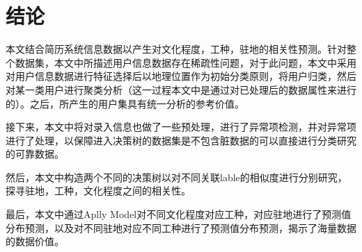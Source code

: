 \section{结论}
本文结合简历系统信息数据以产生对文化程度，工种，驻地的相关性预测。针对整个数据集，本文中所描述用户信息数据存在稀疏性问题，对于此问题，本文中采用对用户信息数据进行特征选择后以地理位置作为初始分类原则，将用户归类，然后对某一类用户进行聚类分析（这一过程本文中是通过对已处理后的数据属性来进行的）。之后，所产生的用户集具有统一分析的参考价值。

接下来，本文中将对录入信息也做了一些预处理，进行了异常项检测，并对异常项进行了处理，以保障进入决策树的数据集是不包含脏数据的可以直接进行分类研究的可靠数据。

然后，本文中构造两个不同的决策树以对不同关联lable的相似度进行分别研究，探寻驻地，工种，文化程度之间的相关性。

最后，本文中通过Aplly Model对不同文化程度对应工种，对应驻地进行了预测值分布预测，以及对不同驻地对应不同工种进行了预测值分布预测，揭示了海量数据的数据价值。
